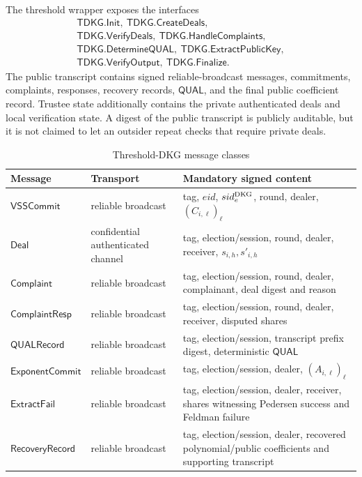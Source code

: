 \documentclass[pdflatex,sn-mathphys-num]{sn-jnl}%
\theoremstyle{thmstyleone}%
\theoremstyle{thmstyletwo}%
\theoremstyle{thmstylethree}%
\begin{document}
The threshold wrapper exposes the interfaces
\[
\begin{gathered}
 \mathsf{TDKG.Init},\ \mathsf{TDKG.CreateDeals},\\
 \mathsf{TDKG.VerifyDeals},\ \mathsf{TDKG.HandleComplaints},\\
 \mathsf{TDKG.DetermineQUAL},\ \mathsf{TDKG.ExtractPublicKey},\\
 \mathsf{TDKG.VerifyOutput},\ \mathsf{TDKG.Finalize}.
\end{gathered}
\]
The public transcript contains signed reliable-broadcast messages,
commitments, complaints, responses, recovery records, $\mathsf{QUAL}$, and
the final public coefficient record.  Trustee state additionally contains the
private authenticated deals and local verification state.  A digest of the
public transcript is publicly auditable, but it is not claimed to let an
outsider repeat checks that require private deals.

\begin{table}[htbp]
\centering
\caption{Threshold-DKG message classes}
\label{tab:dkg-messages}
\scriptsize
\begin{tabular}{p{}p{}p{}}
\toprule
Message & Transport & Mandatory signed content \\
\midrule
$\mathsf{VSSCommit}$ & reliable broadcast & tag, $eid$, $sid_e^{\rm DKG}$, round, dealer, $(C_{i,\ell})_\ell$ \\
$\mathsf{Deal}$ & confidential authenticated channel & tag, election/session, round, dealer, receiver, $s_{i,h},s'_{i,h}$ \\
$\mathsf{Complaint}$ & reliable broadcast & tag, election/session, round, dealer, complainant, deal digest and reason \\
$\mathsf{ComplaintResp}$ & reliable broadcast & tag, election/session, round, dealer, receiver, disputed shares \\
$\mathsf{QUALRecord}$ & reliable broadcast & tag, election/session, transcript prefix digest, deterministic $\mathsf{QUAL}$ \\
$\mathsf{ExponentCommit}$ & reliable broadcast & tag, election/session, dealer, $(A_{i,\ell})_\ell$ \\
$\mathsf{ExtractFail}$ & reliable broadcast & tag, election/session, dealer, receiver, shares witnessing Pedersen success and Feldman failure \\
$\mathsf{RecoveryRecord}$ & reliable broadcast & tag, election/session, dealer, recovered polynomial/public coefficients and supporting transcript \\
\bottomrule
\end{tabular}
\end{table}
\end{document}
